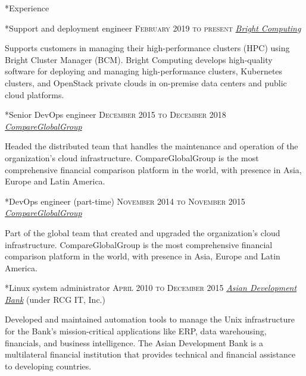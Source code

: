 \documentclass[10pt, a4paper, final]{article}
\begin{document}
\hfill
\begin{minipage}[t]{0.65\linewidth}
  \begin{section}*{Experience}
    \begin{subsection}*{Support and deployment engineer \hfill\textsc{February 2019 to present}}
      \href{https://www.brightcomputing.com/}{\textit{Bright Computing}}  

      Supports customers in managing their high-performance clusters (HPC) using Bright Cluster Manager (BCM). Bright Computing develops high-quality software for deploying and managing high-performance clusters, Kubernetes clusters, and OpenStack private clouds in on-premise data centers and public cloud platforms.
    \end{subsection}
    \vspace{1em}
  
    \begin{subsection}*{Senior DevOps engineer \hfill\textsc{December 2015 to December 2018}}
      \href{http://www.compareglobalgroup.com}{\textit{CompareGlobalGroup}}  

      Headed the distributed team that handles the maintenance and operation of the organization's cloud infrastructure. CompareGlobalGroup is the most comprehensive financial comparison platform in the world, with presence in Asia, Europe and Latin America.
    \end{subsection}
    \vspace{1em}
  
    \begin{subsection}*{DevOps engineer (part-time) \hfill\textsc{November 2014 to November 2015}}
      \href{http://www.compareglobalgroup.com}{\textit{CompareGlobalGroup}}  

      Part of the global team that created and upgraded the organization's cloud infrastructure. CompareGlobalGroup is the most comprehensive financial comparison platform in the world, with presence in Asia, Europe and Latin America.
    \end{subsection}
    \vspace{1em}
  
    \begin{subsection}*{Linux system administrator \hfill\textsc{April 2010 to December 2015}}
      \href{http://www.adb.org}{\textit{Asian Development Bank}} (under RCG IT, Inc.) 

      Developed and maintained automation tools to manage the Unix infrastructure for the Bank's mission-critical applications like ERP, data warehousing, financials, and business intelligence. The Asian Development Bank is a multilateral financial institution that provides technical and financial assistance to developing countries.
    \end{subsection}
    \vspace{1em}
  

\end{section}
\end{minipage}
\end{document}

